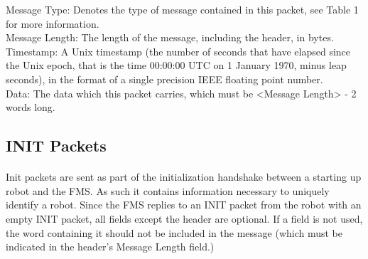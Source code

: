 \documentclass[11pt]{article}
\begin{document}
\clearpage
Message Type: Denotes the type of message contained in this packet, see Table 1 for more information.\\
Message Length: The length of the message, including the header, in bytes.
Timestamp: A Unix timestamp (the number of seconds that have elapsed since the Unix epoch, 
that is the time 00:00:00 UTC on 1 January 1970, minus leap seconds), 
in the format of a single precision IEEE floating point number.\\
Data: The data which this packet carries, which must be <Message Length> - 2 words long.\\

\subsection {INIT Packets}
\paragraph{}
Init packets are sent as part of the initialization handshake between a starting up robot and the FMS.  
As such it contains information necessary to uniquely identify a robot.  
Since the FMS replies to an INIT packet from the robot with an empty INIT packet, all fields except the header are optional.  
If a field is not used, the word containing it should not be included in the message 
(which must be indicated in the header’s Message Length field.)
\newline
\end{document}
